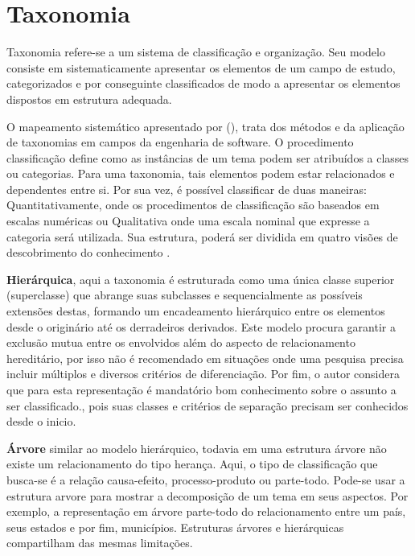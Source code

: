 \section{Taxonomia}
\label{cap2:taxonomia}

Taxonomia refere-se a um sistema de classificação e organização. Seu modelo consiste em sistematicamente apresentar os elementos de um campo de estudo, categorizados e por conseguinte classificados de modo a apresentar os elementos dispostos em estrutura adequada.

O mapeamento sistemático apresentado por \citeauthor{usman_taxonomies_2017} (\citeyear{usman_taxonomies_2017}), trata dos métodos e da aplicação de taxonomias em campos da engenharia de software. O procedimento classificação define como as instâncias de um tema podem ser atribuídos a classes ou categorias. Para uma taxonomia, tais elementos podem estar relacionados e dependentes entre si. Por sua vez, é possível classificar de duas maneiras: Quantitativamente, onde os procedimentos de classificação são baseados em escalas numéricas ou Qualitativa onde uma escala nominal que expresse a categoria será utilizada. Sua estrutura, poderá ser dividida em quatro visões de descobrimento do conhecimento \cite{kwasnik_role_nodate}.

\textbf{Hierárquica}, aqui a taxonomia é estruturada como uma única classe superior (superclasse) que abrange suas subclasses e sequencialmente as possíveis extensões destas, formando um encadeamento hierárquico entre os elementos desde o originário até os derradeiros derivados. Este modelo procura garantir a exclusão mutua entre os envolvidos além do aspecto de relacionamento hereditário, por isso não é recomendado em situações onde uma pesquisa precisa incluir múltiplos e diversos critérios de diferenciação. Por fim, o autor considera que para esta representação é mandatório bom conhecimento sobre o assunto a ser classificado., pois suas classes e critérios de separação precisam ser conhecidos desde o inicio.

\textbf{Árvore} similar ao modelo hierárquico, todavia em uma estrutura árvore não existe um relacionamento do tipo herança. Aqui, o tipo de classificação que busca-se é a relação causa-efeito, processo-produto ou parte-todo. Pode-se usar a estrutura arvore para mostrar a decomposição de um tema em seus aspectos. Por exemplo, a representação em árvore parte-todo do relacionamento entre um país, seus estados e por fim, municípios. Estruturas árvores e hierárquicas compartilham das mesmas limitações.

